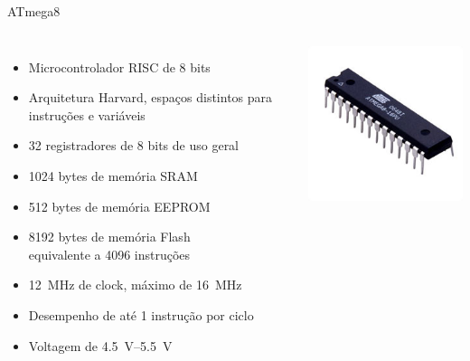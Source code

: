 \documentclass{beamer}
\begin{document}
\begin{frame}{ATmega8}
	\begin{columns}
		\pause
		\begin{itemize}[<+->]
			\item Microcontrolador RISC de 8 bits
			\item Arquitetura Harvard, espaços distintos para instruções e variáveis
			\item 32 registradores de 8 bits de uso geral
			\item 1024 bytes de memória SRAM
			\item 512 bytes de memória EEPROM
			\item 8192 bytes de memória Flash \\
			equivalente a 4096 instruções
			\item \SI{12}{\mega\hertz} de clock, máximo de \SI{16}{\mega\hertz}
			\item Desempenho de até 1 instrução por ciclo
			\item Voltagem de \SIrange{4.5}{5.5}{\volt}
		\end{itemize}

		\includegraphics[width=1.0\textwidth]{img/ATmega8.jpg}
	\end{columns}
\end{frame}
\end{document}
